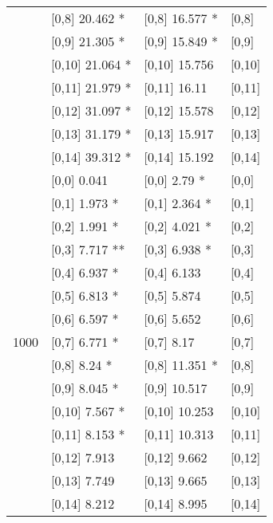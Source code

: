 \begin{table}
\begin{tabular}[t]{llll}
 & {}[0,8] 20.462 * & {}[0,8] 16.577 * & {}[0,8]\\
 & {}[0,9] 21.305 * & {}[0,9] 15.849 * & {}[0,9]\\
\addlinespace
 & {}[0,10] 21.064 * & {}[0,10] 15.756 & {}[0,10]\\
 & {}[0,11] 21.979 * & {}[0,11] 16.11 & {}[0,11]\\
 & {}[0,12] 31.097 * & {}[0,12] 15.578 & {}[0,12]\\
 & {}[0,13] 31.179 * & {}[0,13] 15.917 & {}[0,13]\\
 & {}[0,14] 39.312 * & {}[0,14] 15.192 & {}[0,14]\\
\addlinespace
 & {}[0,0] 0.041 & {}[0,0] 2.79 * & {}[0,0]\\
 & {}[0,1] 1.973 * & {}[0,1] 2.364 * & {}[0,1]\\
 & {}[0,2] 1.991 * & {}[0,2] 4.021 * & {}[0,2]\\
 & {}[0,3] 7.717 ** & {}[0,3] 6.938 * & {}[0,3]\\
 & {}[0,4] 6.937 * & {}[0,4] 6.133 & {}[0,4]\\
\addlinespace
 & {}[0,5] 6.813 * & {}[0,5] 5.874 & {}[0,5]\\
 & {}[0,6] 6.597 * & {}[0,6] 5.652 & {}[0,6]\\
1000 & {}[0,7] 6.771 * & {}[0,7] 8.17 & {}[0,7]\\
 & {}[0,8] 8.24 * & {}[0,8] 11.351 * & {}[0,8]\\
 & {}[0,9] 8.045 * & {}[0,9] 10.517 & {}[0,9]\\
\addlinespace
 & {}[0,10] 7.567 * & {}[0,10] 10.253 & {}[0,10]\\
 & {}[0,11] 8.153 * & {}[0,11] 10.313 & {}[0,11]\\
 & {}[0,12] 7.913 & {}[0,12] 9.662 & {}[0,12]\\
 & {}[0,13] 7.749 & {}[0,13] 9.665 & {}[0,13]\\
 & {}[0,14] 8.212 & {}[0,14] 8.995 & {}[0,14]\\
\bottomrule
\end{tabular}
\end{table}
